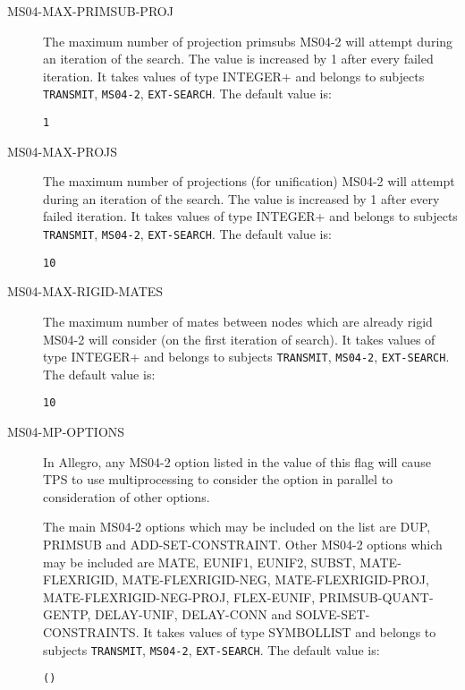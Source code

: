 \begin{description}
\item[MS04-MAX-PRIMSUB-PROJ]  
The maximum number of projection primsubs MS04-2 will attempt during an iteration of the search.
The value is increased by 1 after every failed iteration.
It takes values of type INTEGER+ and belongs to subjects \texttt{TRANSMIT}, \texttt{MS04-2}, \texttt{EXT-SEARCH}.  The default value is: \begin{lstlisting}
1
\end{lstlisting}

\item[MS04-MAX-PROJS]  
The maximum number of projections (for unification) MS04-2 will attempt during an iteration of the search.
The value is increased by 1 after every failed iteration.
It takes values of type INTEGER+ and belongs to subjects \texttt{TRANSMIT}, \texttt{MS04-2}, \texttt{EXT-SEARCH}.  The default value is: \begin{lstlisting}
10
\end{lstlisting}

\item[MS04-MAX-RIGID-MATES]  
The maximum number of mates between nodes which are already rigid
MS04-2 will consider (on the first iteration of search).
It takes values of type INTEGER+ and belongs to subjects \texttt{TRANSMIT}, \texttt{MS04-2}, \texttt{EXT-SEARCH}.  The default value is: \begin{lstlisting}
10
\end{lstlisting}

\item[MS04-MP-OPTIONS]  
In Allegro, any MS04-2 option listed in the value of this flag will
cause TPS to use multiprocessing to consider the option in parallel to
consideration of other options.

The main MS04-2 options which may be included on the list are DUP,
PRIMSUB and ADD-SET-CONSTRAINT.  Other MS04-2 options which may be
included are MATE, EUNIF1, EUNIF2, SUBST, MATE-FLEXRIGID,
MATE-FLEXRIGID-NEG, MATE-FLEXRIGID-PROJ, MATE-FLEXRIGID-NEG-PROJ,
FLEX-EUNIF, PRIMSUB-QUANT-GENTP, DELAY-UNIF, DELAY-CONN and
SOLVE-SET-CONSTRAINTS.
It takes values of type SYMBOLLIST and belongs to subjects \texttt{TRANSMIT}, \texttt{MS04-2}, \texttt{EXT-SEARCH}.  The default value is: \begin{lstlisting}
()
\end{lstlisting}


\end{description}
